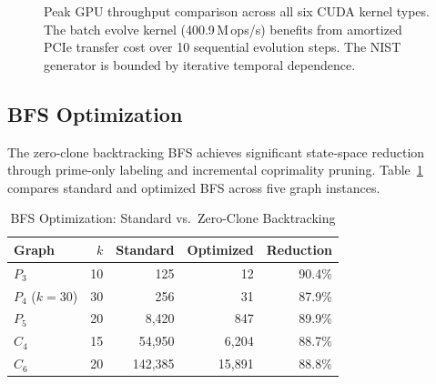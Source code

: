 \documentclass[lettersize,journal]{IEEEtran}
\begin{document}
\begin{figure}[!t]
\centering
{}
\caption{Peak GPU throughput comparison across all six CUDA kernel types. The batch evolve kernel (400.9\,M\,ops/s) benefits from amortized PCIe transfer cost over 10 sequential evolution steps. The NIST generator is bounded by iterative temporal dependence.}
\label{fig:throughput}
\end{figure}

\subsection{BFS Optimization}

The zero-clone backtracking BFS achieves significant state-space reduction through prime-only labeling and incremental coprimality pruning. Table~\ref{tab:bfs} compares standard and optimized BFS across five graph instances.

\begin{table}[!t]
\caption{BFS Optimization: Standard vs.\ Zero-Clone Backtracking\label{tab:bfs}}
\centering
\begin{tabular}{@{}lrrrr@{}}
\toprule
\textbf{Graph} & \textbf{$k$} & \textbf{Standard} & \textbf{Optimized} & \textbf{Reduction} \\
\midrule
$P_3$          & 10  & 125      & 12      & 90.4\% \\
$P_4$ ($k{=}30$) & 30  & 256      & 31      & 87.9\% \\
$P_5$          & 20  & 8{,}420  & 847     & 89.9\% \\
$C_4$          & 15  & 54{,}950 & 6{,}204 & 88.7\% \\
$C_6$          & 20  & 142{,}385& 15{,}891& 88.8\% \\
\bottomrule
\end{tabular}
\end{table}
\end{document}
